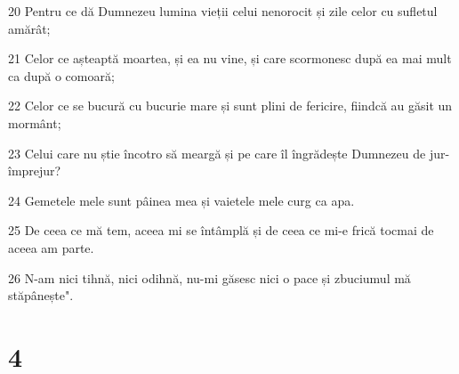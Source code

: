 \par 20 Pentru ce dă Dumnezeu lumina vieții celui nenorocit și zile celor cu sufletul amărât;
\par 21 Celor ce așteaptă moartea, și ea nu vine, și care scormonesc după ea mai mult ca după o comoară;
\par 22 Celor ce se bucură cu bucurie mare și sunt plini de fericire, fiindcă au găsit un mormânt;
\par 23 Celui care nu știe încotro să meargă și pe care îl îngrădește Dumnezeu de jur-împrejur?
\par 24 Gemetele mele sunt pâinea mea și vaietele mele curg ca apa.
\par 25 De ceea ce mă tem, aceea mi se întâmplă și de ceea ce mi-e frică tocmai de aceea am parte.
\par 26 N-am nici tihnă, nici odihnă, nu-mi găsesc nici o pace și zbuciumul mă stăpânește".

\chapter{4}

